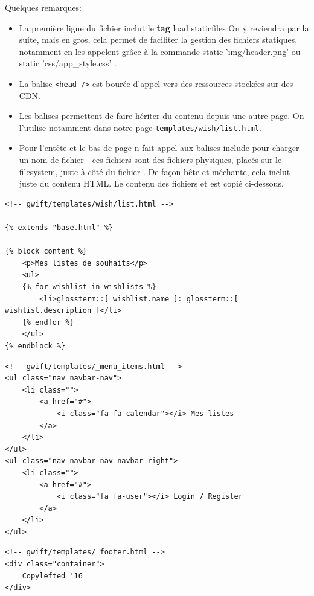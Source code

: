 \documentclass[11pt]{amsbook}
\begin{document}
Quelques remarques:


\begin{itemize}

\item La première ligne du fichier inclut le \textbf{tag}  load staticfiles On y reviendra par la suite, mais en gros, cela permet de faciliter la gestion des fichiers statiques, notamment en les appelent grâce à la commande static 'img/header.png' ou static 'css/app\_style.css' .

\item La balise \texttt{<head />} est bourée d’appel vers des ressources stockées sur des CDN.

\item Les balises permettent de faire hériter du contenu depuis une autre page. On l’utilise notamment dans notre page \texttt{templates/wish/list.html}.

\item Pour l’entête et le bas de page n fait appel aux balises include pour charger un nom de fichier - ces fichiers sont des fichiers physiques, placés sur le filesystem, juste à côté du fichier . De façon bête et méchante, cela inclut juste du contenu HTML. Le contenu des fichiers  et  est copié ci-dessous.

\end{itemize}


\begin{verbatim}
<!-- gwift/templates/wish/list.html -->

{% extends "base.html" %}

{% block content %}
    <p>Mes listes de souhaits</p>
    <ul>
    {% for wishlist in wishlists %}
        <li>glossterm::[ wishlist.name ]: glossterm::[ wishlist.description ]</li>
    {% endfor %}
    </ul>
{% endblock %}
\end{verbatim}

\begin{verbatim}
<!-- gwift/templates/_menu_items.html -->
<ul class="nav navbar-nav">
    <li class="">
        <a href="#">
            <i class="fa fa-calendar"></i> Mes listes
        </a>
    </li>
</ul>
<ul class="nav navbar-nav navbar-right">
    <li class="">
        <a href="#">
            <i class="fa fa-user"></i> Login / Register
        </a>
    </li>
</ul>
\end{verbatim}

\begin{verbatim}
<!-- gwift/templates/_footer.html -->
<div class="container">
    Copylefted '16
</div>
\end{verbatim}
\end{document}
